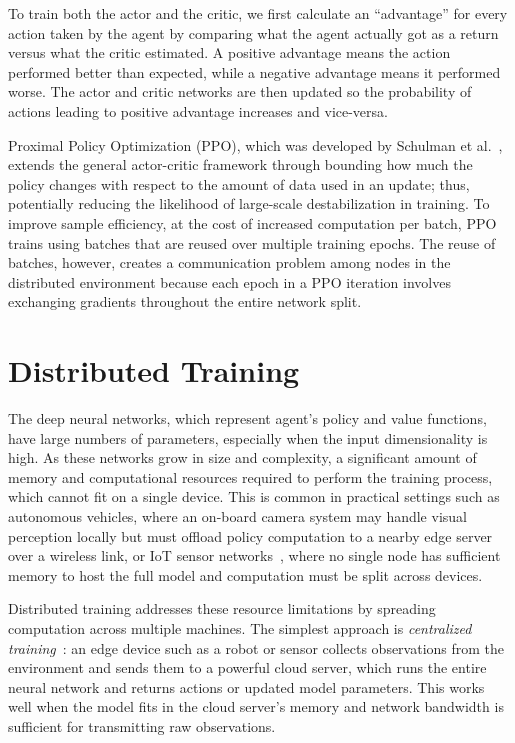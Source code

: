 To train both the actor and the critic, we first calculate an ``advantage'' for every action taken by the agent by comparing what the agent actually got as a return versus what the critic estimated. A positive advantage means the action performed better than expected, while a negative advantage means it performed worse. The actor and critic networks are then updated so the probability of actions leading to positive advantage increases and vice-versa.

Proximal Policy Optimization (PPO), which was developed by Schulman et al.~\cite{ppo2017}, extends the general actor-critic framework through bounding how much the policy changes with respect to the amount of data used in an update; thus, potentially reducing the likelihood of large-scale destabilization in training. To improve sample efficiency, at the cost of increased computation per batch, PPO trains using batches that are reused over multiple training epochs. The reuse of batches, however, creates a communication problem among nodes in the distributed environment because each epoch in a PPO iteration involves exchanging gradients throughout the entire network split.

\section{Distributed Training}

The deep neural networks, which represent agent's policy and value functions, have large numbers of parameters, especially when the input dimensionality is high. As these networks grow in size and complexity, a significant amount of memory and computational resources required to perform the training process, which cannot fit on a single device. This is common in practical settings such as autonomous vehicles, where an on-board camera system may handle visual perception locally but must offload policy computation to a nearby edge server over a wireless link, or IoT sensor networks~\cite{feng2023}, where no single node has sufficient memory to host the full model and computation must be split across devices.

Distributed training addresses these resource limitations by spreading computation across multiple machines. The simplest approach is \emph{centralized training}~\cite{impala2018, nair2015}: an edge device such as a robot or sensor collects observations from the environment and sends them to a powerful cloud server, which runs the entire neural network and returns actions or updated model parameters. This works well when the model fits in the cloud server's memory and network bandwidth is sufficient for transmitting raw observations.

